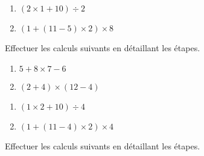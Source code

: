 \documentclass{/home/nyaucki/Documents/Prof/CoursMaths/mycls/DevoirMaison}
\begin{document}
\begin{multicols}{2}
	\begin{enumerate}[start=3,label=\alph*.]
		\item $(2 \times 1 +10 ) \div 2$  \vspace*{8em}
		\item $(1 + (11 -5)\times 2)\times 8$ \vspace*{8em}
	\end{enumerate}
\end{multicols}



\newpage





\renewcommand{\nom}{SARAR Inès} 

\renewcommand{\prenom}{Inès}



Effectuer les calculs suivants en détaillant les étapes.

\begin{multicols}{2}
	\begin{enumerate}[label=\alph*.]
		\item $5 + 8 \times 7 - 6$  \vspace*{7em}
		\item $(2 +4)\times (12 -4)$ \vspace*{7em}
	\end{enumerate}
\end{multicols}

\begin{multicols}{2}
	\begin{enumerate}[start=3,label=\alph*.]
		\item $(1 \times 2 +10 ) \div 4$  \vspace*{8em}
		\item $(1 + (11 -4)\times 2)\times 4$ \vspace*{8em}
	\end{enumerate}
\end{multicols}



\vfill




\renewcommand{\nom}{TOY Yasin} 

\renewcommand{\prenom}{Yasin}



Effectuer les calculs suivants en détaillant les étapes.
\end{document}
